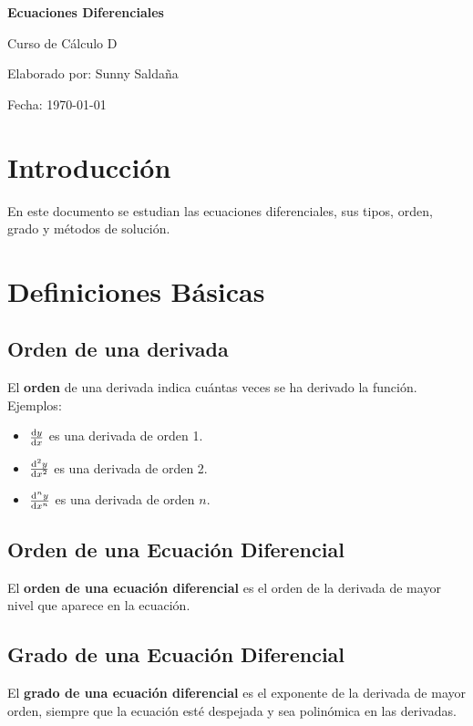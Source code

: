 \documentclass[a4paper, 12pt]{article}
\begin{document}
  \begin{titlepage}
    \centering
    \vspace*{4cm}
    {\large \textbf{Ecuaciones Diferenciales} \par}
    \vspace{1.5cm}
    {\large Curso de Cálculo D \par}
    \vspace{2cm}
    {\large Elaborado por: Sunny Saldaña \par}
    \vspace{1.5cm}
    {\large Fecha: \today \par}
    \vfill
  \end{titlepage}

  \tableofcontents
  \newpage

  \section{Introducción}
  En este documento se estudian las ecuaciones diferenciales, sus tipos, orden, grado y métodos de solución.

  \section{Definiciones Básicas}
  \subsection{Orden de una derivada}
  El \textbf{orden} de una derivada indica cuántas veces se ha derivado la función. Ejemplos:
  \begin{itemize}
    \item $\dv{y}{x}$ es una derivada de orden 1.
    \item $\dv[2]{y}{x}$ es una derivada de orden 2.
    \item $\dv[n]{y}{x}$ es una derivada de orden $n$.
  \end{itemize}

  \subsection{Orden de una Ecuación Diferencial}
  El \textbf{orden de una ecuación diferencial} es el orden de la derivada de mayor nivel que aparece en la ecuación.

  \subsection{Grado de una Ecuación Diferencial}
  El \textbf{grado de una ecuación diferencial} es el exponente de la derivada de mayor orden, siempre que la ecuación esté despejada
  y sea polinómica en las derivadas.
\end{document}

